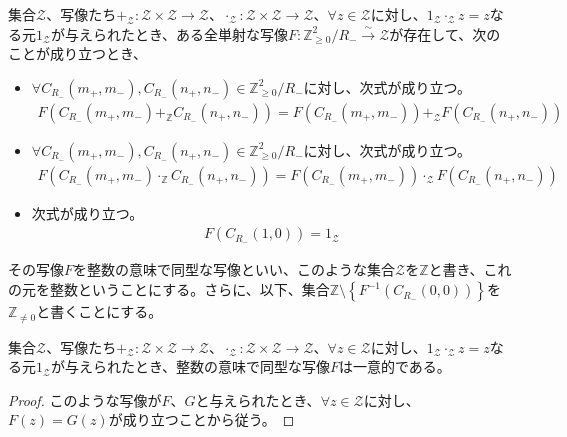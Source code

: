 \documentclass[dvipdfmx]{jsarticle}
\begin{document}
\begin{dfn}
集合$\mathcal{Z}$、写像たち$+_{\mathcal{Z}}\mathcal{:Z \times Z \rightarrow Z}$、$\cdot_{\mathcal{Z}}:\mathcal{Z} \times \mathcal{Z} \rightarrow \mathcal{Z}$、$\forall z \in \mathcal{Z}$に対し、$1_{\mathcal{Z}} \cdot_{\mathcal{Z}}z = z$なる元$1_{\mathcal{Z}}$が与えられたとき、ある全単射な写像$F:\mathbb{Z}_{\geq 0}^{2} /R_{-} \overset{\sim}{\rightarrow}\mathcal{Z}$が存在して、次のことが成り立つとき、
\begin{itemize}
\item
  $\forall C_{R_{-}}\left( m_{+},m_{-} \right),C_{R_{-}}\left( n_{+},n_{-} \right) \in \mathbb{Z}_{\geq 0}^{2} /R_{-} $に対し、次式が成り立つ。
\begin{align*}
F\left( C_{R_{-}}\left( m_{+},m_{-} \right) +_{\mathbb{Z}}C_{R_{-}}\left( n_{+},n_{-} \right) \right) = F\left( C_{R_{-}}\left( m_{+},m_{-} \right) \right) +_{\mathcal{Z}}F\left( C_{R_{-}}\left( n_{+},n_{-} \right) \right)
\end{align*}
\item
  $\forall C_{R_{-}}\left( m_{+},m_{-} \right),C_{R_{-}}\left( n_{+},n_{-} \right) \in \mathbb{Z}_{\geq 0}^{2} /R_{-} $に対し、次式が成り立つ。
\begin{align*}
F\left( C_{R_{-}}\left( m_{+},m_{-} \right) \cdot_{\mathbb{Z}}C_{R_{-}}\left( n_{+},n_{-} \right) \right) = F\left( C_{R_{-}}\left( m_{+},m_{-} \right) \right) \cdot_{\mathcal{Z}}F\left( C_{R_{-}}\left( n_{+},n_{-} \right) \right)
\end{align*}
\item
  次式が成り立つ。
\begin{align*}
F\left( C_{R_{-}}(1,0) \right) = 1_{\mathcal{Z}}
\end{align*}
\end{itemize}
その写像$F$を整数の意味で同型な写像といい、このような集合$\mathcal{Z}$を$\mathbb{Z}$と書き、これの元を整数ということにする。さらに、以下、集合$\mathbb{Z} \setminus \left\{ F^{- 1}\left( C_{R_{-}}(0,0) \right) \right\}$を$\mathbb{Z}_{\neq 0}$と書くことにする。
\end{dfn}
\begin{thm}\label{1.2.6.9}
集合$\mathcal{Z}$、写像たち$+_{\mathcal{Z}}\mathcal{:Z \times Z \rightarrow Z}$、$\cdot_{\mathcal{Z}}:\mathcal{Z} \times \mathcal{Z} \rightarrow \mathcal{Z}$、$\forall z \in \mathcal{Z}$に対し、$1_{\mathcal{Z}} \cdot_{\mathcal{Z}}z = z$なる元$1_{\mathcal{Z}}$が与えられたとき、整数の意味で同型な写像$F$は一意的である。
\end{thm}
\begin{proof}
このような写像が$F$、$G$と与えられたとき、$\forall z \in \mathcal{Z}$に対し、$F(z) = G(z)$が成り立つことから従う。
\end{proof}
\end{document}
